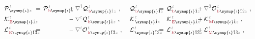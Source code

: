 \begin{subequations}
\begin{align}
	&{\mathcal{P}}^{\;\!\mathcolor{gray}{t}}_{\;\! \symup{\iota} \mathcolor{gray}{z}} \hspace{-2.0em}&&=\hspace{0.2em} {\mathcal{P}}^{\;\!\mathcolor{gray}{t}}_{\;\!\textcolor{Maroon}{\text{b}} \symup{\iota} \mathcolor{gray}{z}} &&\hspace{-2.0em}+ \mathcolor{gray}{\nabla^{\hat{1}}} {\mathcal{Q}}^{\;\!\mathcolor{gray}{t}}_{\;\!\textcolor{Maroon}{\text{b}} \symup{\iota} \mathcolor{gray}{\hat{1}} \mathcolor{gray}{z}}~, &&\hspace{0.3em} {\mathcal{Q}}^{\;\!\mathcolor{gray}{t}}_{\;\!\textcolor{Maroon}{\text{b}} \symup{\iota}\hat{1} \mathcolor{gray}{z}} \hspace{-2.0em}&&=\hspace{0.2em} {\mathcal{Q}}^{\;\!\mathcolor{gray}{t}}_{\;\!\textcolor{Maroon}{\text{b}} \symup{\iota}\hat{1} \mathcolor{gray}{z}} &&\hspace{-2.0em}+ \mathcolor{gray}{\nabla^{\hat{2}}} {\mathcal{O}}^{\;\!\mathcolor{gray}{t}}_{\;\!\textcolor{Maroon}{\text{b}} \symup{\iota} \hat{1} \mathcolor{gray}{\hat{2}} \mathcolor{gray}{z}}~, \label{eq:Pb-QB} \\
	&{\mathcal{K}}^{\;\!\mathcolor{gray}{t}}_{\;\!\textcolor{Maroon}{\text{E}} \symup{\iota}\hat{1} \mathcolor{gray}{z}} \hspace{-2.0em}&&=\hspace{0.2em} &&\hspace{-2.0em}- \mathcolor{gray}{\nabla^t} {\mathcal{Q}}^{\;\!\mathcolor{gray}{t}}_{\;\!\textcolor{Maroon}{\text{b}} \symup{\iota}\hat{1} \mathcolor{gray}{z}}~, &&\hspace{0.3em} {\mathcal{K}}^{\;\!\mathcolor{gray}{t}}_{\;\! \symup{\iota}\hat{1} \mathcolor{gray}{z}} \hspace{-2.0em}&&=\hspace{0.2em} {\mathcal{K}}^{\;\!\mathcolor{gray}{t}}_{\;\!\textcolor{Maroon}{\text{E}} \symup{\iota}\hat{1} \mathcolor{gray}{z}} &&\hspace{-2.0em}+ {\mathcal{K}}^{\;\!\mathcolor{gray}{t}}_{\;\!\textcolor{Maroon}{\text{M}} \symup{\iota}\hat{1} \mathcolor{gray}{z}}~, \label{eq:KE-Kb} \\
	&{\mathcal{L}}^{\;\!\mathcolor{gray}{t}}_{\;\!\textcolor{Maroon}{\text{E}} \symup{\iota}\hat{1}\hat{3} \mathcolor{gray}{z}} \hspace{-2.0em}&&=\hspace{0.2em} &&\hspace{-2.0em}- \mathcolor{gray}{\nabla^t} {\mathcal{O}}^{\;\!\mathcolor{gray}{t}}_{\;\!\textcolor{Maroon}{\text{b}} \symup{\iota}\hat{1}\hat{3} \mathcolor{gray}{z}}~, &&\hspace{0.3em} {\mathcal{L}}^{\;\!\mathcolor{gray}{t}}_{\;\! \symup{\iota}\hat{1}\hat{3} \mathcolor{gray}{z}} \hspace{-2.0em}&&=\hspace{0.2em} {\mathcal{L}}^{\;\!\mathcolor{gray}{t}}_{\;\!\textcolor{Maroon}{\text{E}} \symup{\iota}\hat{1}\hat{3} \mathcolor{gray}{z}} &&\hspace{-2.0em}+ {\mathcal{L}}^{\;\!\mathcolor{gray}{t}}_{\;\!\textcolor{Maroon}{\text{M}} \symup{\iota}\hat{1}\hat{3} \mathcolor{gray}{z}}~, \label{eq:LE-Lb}

\end{align}
\end{subequations}
